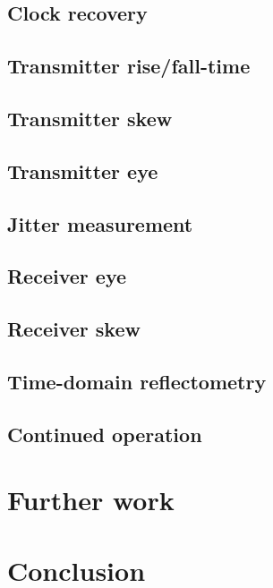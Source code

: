 \documentclass[a4paper,11pt]{report}
\begin{document}
    \section{Clock recovery}
    \section{Transmitter rise/fall-time}
    \section{Transmitter skew}
    \section{Transmitter eye}
    \section{Jitter measurement}
    \section{Receiver eye}
    \section{Receiver skew}
    \section{Time-domain reflectometry}
    \section{Continued operation}

  \chapter{Further work}
  
  \chapter{Conclusion}

  
  \printglossary[type=\acronymtype]
\end{document}
